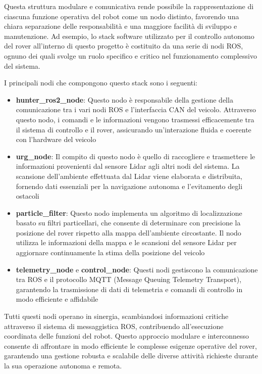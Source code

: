 \noindent Questa struttura modulare e comunicativa rende possibile la rappresentazione di ciascuna funzione operativa del robot come un nodo distinto, favorendo una chiara separazione delle responsabilità e una maggiore facilità di sviluppo e manutenzione. Ad esempio, lo stack software utilizzato per il controllo autonomo del rover all'interno di questo progetto è costituito da una serie di nodi ROS, ognuno dei quali svolge un ruolo specifico e critico nel funzionamento complessivo del sistema.

\noindent I principali nodi che compongono questo stack sono i seguenti:

\begin{itemize}
  \item \textbf{hunter\_ros2\_node}: Questo nodo è responsabile della gestione della comunicazione tra i vari nodi ROS e l'interfaccia CAN del veicolo. Attraverso questo nodo, i comandi e le informazioni vengono trasmessi efficacemente tra il sistema di controllo e il rover, assicurando un'interazione fluida e coerente con l'hardware del veicolo

  \item \textbf{urg\_node}: Il compito di questo nodo è quello di raccogliere e trasmettere le informazioni provenienti dal sensore Lidar agli altri nodi del sistema. La scansione dell'ambiente effettuata dal Lidar viene elaborata e distribuita, fornendo dati essenziali per la navigazione autonoma e l'evitamento degli ostacoli

  \item \textbf{particle\_filter}: Questo nodo implementa un algoritmo di localizzazione basato su filtri particellari, che consente di determinare con precisione la posizione del rover rispetto alla mappa dell'ambiente circostante. Il nodo utilizza le informazioni della mappa e le scansioni del sensore Lidar per aggiornare continuamente la stima della posizione del veicolo

  \item \textbf{telemetry\_node} e \textbf{control\_node}: Questi nodi gestiscono la comunicazione tra ROS e il protocollo MQTT (Message Queuing Telemetry Transport), garantendo la trasmissione di dati di telemetria e comandi di controllo in modo efficiente e affidabile
\end{itemize}

\noindent Tutti questi nodi operano in sinergia, scambiandosi informazioni critiche attraverso il sistema di messaggistica ROS, contribuendo all'esecuzione coordinata delle funzioni del robot. Questo approccio modulare e interconnesso consente di affrontare in modo efficiente le complesse esigenze operative del rover, garantendo una gestione robusta e scalabile delle diverse attività richieste durante la sua operazione autonoma e remota.
